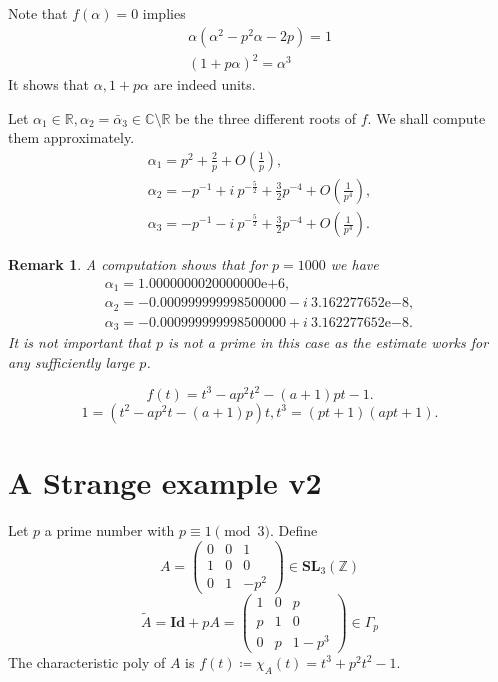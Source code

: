 \documentclass[a4paper]{article}
\newtheorem{Rem}[Thm]{Remark}
\DeclareMathOperator{\assign}{\coloneqq}        %
\newcommand{\R}{\mathbb{R}}        %
\newcommand{\C}{\mathbb{C}}        %
\newcommand{\Id}{\mathbf{Id}}        %
\newcommand{\SL}{\mathbf{SL}_3(\mathbb{Z})}        %
\newcommand{\SLp}{\Gamma_p}        %
\begin{document}
Note that $f(\alpha) = 0$ implies 
\begin{gather}
\alpha (\alpha ^2 - p^2 \alpha - 2 p) = 1
\\
(1 + p \alpha)^2 = \alpha^3
\end{gather}
It shows that $\alpha, 1 + p \alpha$ are indeed units.

Let $\alpha_1 \in \R, \alpha_2 = \bar \alpha_3 \in \C \setminus \R$ be the three different roots of $f$.
We shall compute them approximately.
\begin{gather*}
\alpha_1 = p^2 + \frac{2}{p} + O\left(\frac{1}{p}\right), \\
\alpha_2 = - p^{-1} + i~p^{-\frac{5}{2}} + \frac{3}{2}p^{-4} + O\left(\frac{1}{p^4}\right), \\
\alpha_3 = - p^{-1} - i~p^{-\frac{5}{2}} + \frac{3}{2}p^{-4} + O\left(\frac{1}{p^4}\right)
.\end{gather*}

\begin{Rem}
A computation shows that for $p = 1000$ we have
\begin{gather*}
\alpha_1 = 1.0000000020000000\mathrm{e}{+6} , \\
\alpha_2 = -0.000999999998500000 - i~ 3.162277652\mathrm{e}{-8}, \\
\alpha_3 = -0.000999999998500000 + i~ 3.162277652\mathrm{e}{-8}
.\end{gather*}
It is not important that $p$ is not a prime in this case as the estimate works for any sufficiently large $p$.
\end{Rem}


\[
f(t) = t^3 - a p^2 t^2 - (a + 1)p t - 1
.\] 
\[
1 = (t^2 - a p^2 t - (a + 1)p) t, 
t^3 =  (p t + 1) (a p t + 1)
.\] 

\section{A Strange example v2}
Let $p$ a prime number with $p \equiv 1 \pmod 3$.
Define
\begin{equation}
A = 
\begin{pmatrix}
0 & 0 & 1 \\
1 & 0 & 0 \\
0 & 1 & -p^2
\end{pmatrix}
\in \SL
\end{equation}
\begin{equation}
\tilde A = \Id + p A =
\begin{pmatrix}
1 & 0 & p \\
p & 1 & 0 \\
0 & p & 1 - p^3
\end{pmatrix}
\in \SLp
\end{equation}
The characteristic poly of $A$ is $ f(t) \assign \chi_A(t) = t^3 + p^2 t^2 - 1$.
\end{document}
